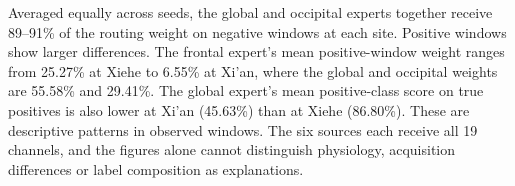 Averaged equally across seeds, the global and occipital experts together receive 89--91\% of the routing weight on negative windows at each site. Positive windows show larger differences. The frontal expert's mean positive-window weight ranges from 25.27\% at Xiehe to 6.55\% at Xi'an, where the global and occipital weights are 55.58\% and 29.41\%. The global expert's mean positive-class score on true positives is also lower at Xi'an (45.63\%) than at Xiehe (86.80\%). These are descriptive patterns in observed windows. The six sources each receive all 19 channels, and the figures alone cannot distinguish physiology, acquisition differences or label composition as explanations.
